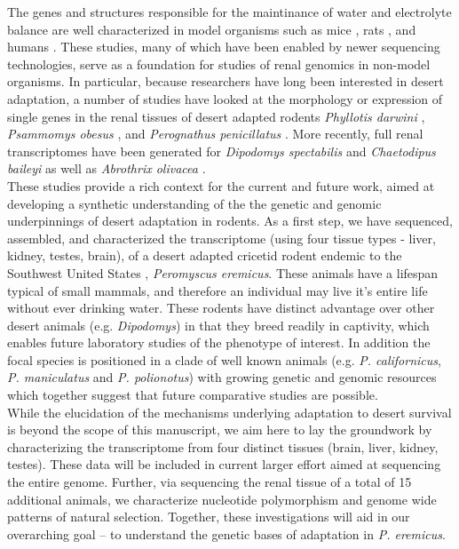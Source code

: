 \documentclass[11pt]{article}
\begin{document}
The genes and structures responsible for the maintinance of water and electrolyte balance are well characterized in model organisms such as mice \cite{Tatum:2009kp}, rats \cite{Romero:2007fs,Rojek:2006dg,NIELSEN:1995uq}, and humans \cite{Mobasheri:2007tt,Bedford:2003wa,NIELSEN:1999vg}. These studies, many of which have been enabled by newer sequencing technologies, serve as a foundation for studies of renal genomics in non-model organisms. In particular, because researchers have long been interested in desert adaptation, a number of studies have looked at the morphology or expression of single genes in the renal tissues of desert adapted rodents \textit{Phyllotis darwini} \cite{Gallardo:2005fm}, \textit{Psammomys obesus} \cite{Kaissling:1975uu}, and \textit{Perognathus penicillatus} \cite{Altschuler:1979du}. More recently, full renal transcriptomes have been generated for \textit{Dipodomys spectabilis} and \textit{Chaetodipus baileyi} \cite{Marra:2014de} as well as \textit{Abrothrix olivacea} \cite{Giorello:2014iv}. \\

These studies provide a rich context for the current and future work, aimed at developing a synthetic understanding of the the genetic and genomic underpinnings of desert adaptation in rodents. As a first step, we have sequenced, assembled, and characterized the transcriptome (using four tissue types - liver, kidney, testes, brain), of a desert adapted cricetid rodent endemic to the Southwest United States \cite{Veal:2001vp}, \textit{Peromyscus eremicus}. These animals have a lifespan typical of small mammals, and therefore an individual may live it's entire life without ever drinking water. These rodents have distinct advantage over other desert animals (e.g. \textit{Dipodomys}) in that they breed readily in captivity, which enables future laboratory studies of the phenotype of interest. In addition the focal species is positioned in a clade of well known animals (e.g. \textit{P. californicus}, \textit{P. maniculatus} and \textit{P. polionotus}) \cite{Bradley:2007jo} with growing genetic and genomic resources \cite{Shorter:2014kw,Panhuis:2011co,Shorter:2012ib} which together suggest that future comparative studies are possible. \\


While the elucidation of the mechanisms underlying adaptation to desert survival is beyond the scope of this manuscript, we aim here to lay the groundwork by characterizing the transcriptome from four distinct tissues (brain, liver, kidney, testes). These data will be included in current larger effort aimed at sequencing the entire genome. Further, via sequencing the renal tissue of a total of 15 additional animals, we characterize nucleotide polymorphism and genome wide patterns of natural selection. Together, these investigations will aid in our overarching goal -- to understand the genetic bases of adaptation in \textit{P. eremicus}.
\end{document}
